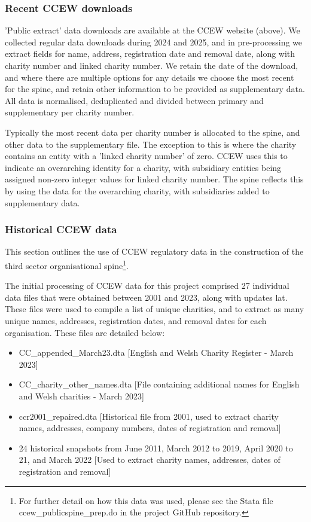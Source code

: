 \documentclass{article}
\begin{document}
\subsubsection{Recent CCEW downloads}
'Public extract' data downloads are available at the CCEW website (above). We collected regular data downloads during 2024 and 2025,
and in pre-processing we extract fields for name, address, registration date and removal date, along with charity number and linked charity number.
We retain the date of the download, and where there are multiple options for any details we choose the most recent for the spine, and 
retain other information to be provided as supplementary data. All data is normalised, deduplicated and divided between primary and 
supplementary per charity number.

Typically the most recent data per charity number is allocated to the spine, and other data to the supplementary file. The exception to this
is where the charity contains an entity with a 'linked charity number' of zero. CCEW uses this to indicate an overarching identity for 
a charity, with subsidiary entities being assigned non-zero integer values for linked charity number. The spine reflects this by
using the data for the overarching charity, with subsidiaries added to supplementary data.




\subsubsection{Historical CCEW data}

This section outlines the use of CCEW regulatory data in the construction of the third sector
organisational spine\footnote {For further detail on how this data was used, please see the Stata file
ccew\_publicspine\_prep.do in the project GitHub repository.}.

The initial processing of CCEW data for this project comprised 27 individual data files that were obtained
between 2001 and 2023, along with updates lat. These files were used to compile a list of unique charities, and to
extract   as   many   unique   names,   addresses,   registration   dates,   and   removal   dates   for   each
organisation. These files are detailed below: 
\begin{itemize}
  \item CC\_appended\_March23.dta [English and Welsh Charity Register - March 2023]

  \item CC\_charity\_other\_names.dta [File containing additional names for English and Welsh
charities - March 2023]
  \item ccr2001\_repaired.dta   [Historical   file   from   2001,   used   to   extract   charity   names,
addresses, company numbers, dates of registration and removal]
  \item 24 historical snapshots from June 2011, March 2012 to 2019, April 2020 to 21, and March
2022 [Used to extract charity names, addresses, dates of registration and removal]
\end{itemize}
\end{document}
